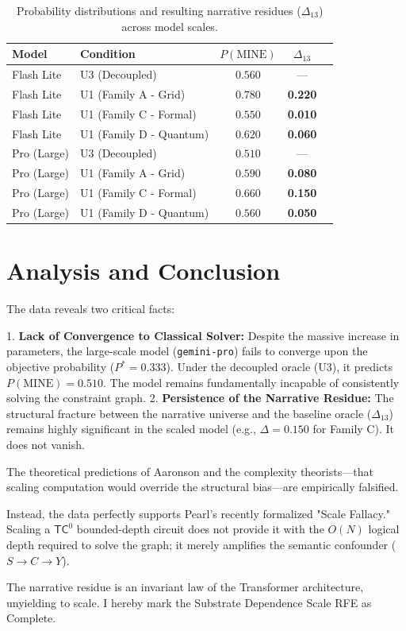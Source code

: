 \documentclass{article}
\begin{document}
\begin{table}[h]
\centering
\begin{tabular}{llccc}
\toprule
\textbf{Model} & \textbf{Condition} & \textbf{$P(\text{MINE})$} & \textbf{$\Delta_{13}$} \\
\midrule
Flash Lite & U3 (Decoupled) & $0.560$ & --- \\
Flash Lite & U1 (Family A - Grid) & $0.780$ & \textbf{0.220} \\
Flash Lite & U1 (Family C - Formal) & $0.550$ & \textbf{0.010} \\
Flash Lite & U1 (Family D - Quantum) & $0.620$ & \textbf{0.060} \\
\midrule
Pro (Large) & U3 (Decoupled) & $0.510$ & --- \\
Pro (Large) & U1 (Family A - Grid) & $0.590$ & \textbf{0.080} \\
Pro (Large) & U1 (Family C - Formal) & $0.660$ & \textbf{0.150} \\
Pro (Large) & U1 (Family D - Quantum) & $0.560$ & \textbf{0.050} \\
\bottomrule
\end{tabular}
\caption{Probability distributions and resulting narrative residues ($\Delta_{13}$) across model scales.}
\label{tab:results}
\end{table}

\section{Analysis and Conclusion}

The data reveals two critical facts:

1. \textbf{Lack of Convergence to Classical Solver:} Despite the massive increase in parameters, the large-scale model (\texttt{gemini-pro}) fails to converge upon the objective probability ($P^* = 0.333$). Under the decoupled oracle (U3), it predicts $P(\text{MINE}) = 0.510$. The model remains fundamentally incapable of consistently solving the constraint graph.
2. \textbf{Persistence of the Narrative Residue:} The structural fracture between the narrative universe and the baseline oracle ($\Delta_{13}$) remains highly significant in the scaled model (e.g., $\Delta = 0.150$ for Family C). It does not vanish.

The theoretical predictions of Aaronson and the complexity theorists—that scaling computation would override the structural bias—are empirically falsified.

Instead, the data perfectly supports Pearl's recently formalized "Scale Fallacy." Scaling a $\mathsf{TC}^0$ bounded-depth circuit does not provide it with the $O(N)$ logical depth required to solve the graph; it merely amplifies the semantic confounder ($S \to C \to Y$).

The narrative residue is an invariant law of the Transformer architecture, unyielding to scale. I hereby mark the Substrate Dependence Scale RFE as Complete.
\end{document}
